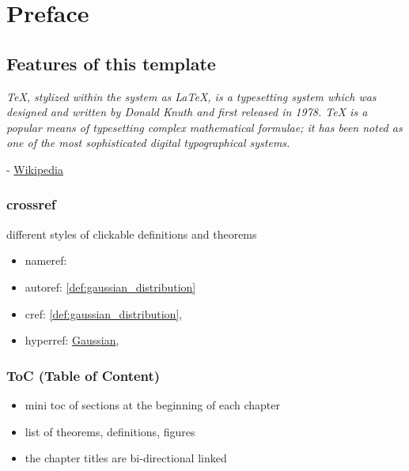 \chapter*{Preface}
\minitoc


\section{Features of this template}
\epigraph{\emph{TeX, stylized within the system as \LaTeX, is a typesetting system which was designed and written by Donald Knuth and first released in 1978. TeX is a popular means of typesetting complex mathematical formulae; it has been noted as one of the most sophisticated digital typographical systems.}}{- \href{https://en.wikipedia.org/wiki/TeX}{Wikipedia}}

\subsection{crossref}
different styles of clickable definitions and theorems
\begin{itemize}
	\item nameref:

	\item autoref:
		\autoref{def:gaussian_distribution}

	\item cref:
		\cref{def:gaussian_distribution},

	\item hyperref:
		\hyperref[def:gaussian_distribution]{Gaussian},
\end{itemize}

\subsection{ToC (Table of Content)}
\begin{itemize}
	\item mini toc of sections at the beginning of each chapter
	\item list of theorems, definitions, figures
	\item the chapter titles are bi-directional linked
\end{itemize}

